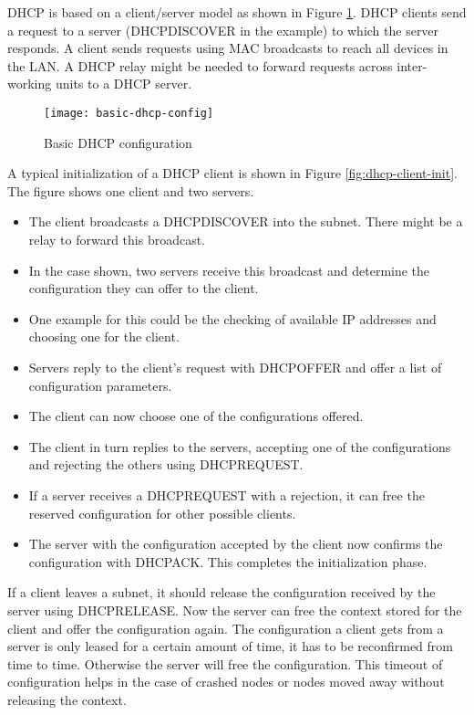 DHCP is based on a client/server model as shown in Figure \ref{fig:basic-dhcp-config}. DHCP clients send a request to a server (DHCPDISCOVER in the example) to which
the server responds. A client sends requests using MAC broadcasts to reach all devices in the LAN. A DHCP relay might be needed to forward requests across inter-working units to a DHCP server.

	
	\begin{figure}[hb!]
	\centering
	\texttt{[image: basic-dhcp-config]}
	\caption{Basic DHCP configuration}\label{fig:basic-dhcp-config}
	\end{figure}


A typical initialization of a DHCP client is shown in Figure \ref{fig:dhcp-client-init}. The figure shows one client and two servers. 
\begin{itemize}
	\item The client broadcasts a DHCPDISCOVER into the subnet. There might be a relay to forward this broadcast. 
	\item In the case shown, two servers receive this broadcast and determine the configuration they can offer to the client. 
	\item One example for this could be the checking of available IP addresses and choosing one for the client. 
	\item Servers reply to the client’s request with DHCPOFFER and offer a list of configuration parameters. 
	\item The client can now choose one of the configurations offered.
	\item The client in turn replies to the servers, accepting one of the configurations and rejecting the others using DHCPREQUEST.
	\item If a server receives a DHCPREQUEST with a rejection, it can free the reserved configuration for other possible clients. 
	\item The server with the configuration accepted by the client now confirms the configuration with DHCPACK. This completes the initialization phase.
	
\end{itemize}

If a client leaves a subnet, it should release the configuration received by the server using DHCPRELEASE. Now the server can free the context stored for the client and offer the configuration again. The configuration a client gets from a server is only leased for a certain amount of time, it has to be reconfirmed from time to time. Otherwise the server will free the configuration. This timeout of configuration helps in the case of crashed nodes or nodes moved away without releasing the context.

